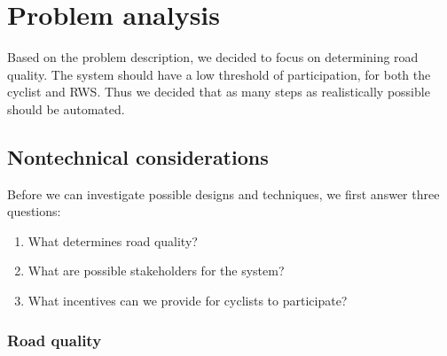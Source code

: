 \documentclass[a4paper,11pt]{article}
\begin{document}
\section{Problem analysis}

Based on the problem description, we decided to focus on determining road quality. The system should have a low threshold of participation, for both the cyclist and RWS.
Thus we decided that as many steps as realistically possible should be automated.

\subsection{Nontechnical considerations}

Before we can investigate possible designs and techniques, we first answer three questions:
\begin{enumerate}\setlength{\itemsep}{-3pt}
\item What determines road quality?
\item What are possible stakeholders for the system?
\item What incentives can we provide for cyclists to participate?
\end{enumerate}

\subsubsection{Road quality}
\end{document}
